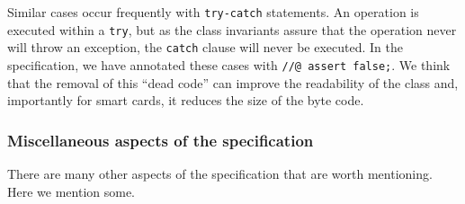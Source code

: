 \documentclass[a4paper]{llncs}
\begin{document}
Similar cases occur frequently with \texttt{try-catch} statements. An
operation is executed within a \texttt{try}, but as the class invariants
assure that the operation never will throw an exception, the
\texttt{catch} clause will never be executed. In the specification, we 
have annotated these cases with \texttt{//@ assert false;}. We think
that the removal of this ``dead code'' can improve the readability of
the class and, importantly for smart cards, it reduces the 
size of the byte code.


\subsubsection{Miscellaneous aspects of the specification}
There are many other aspects of the specification that are worth
mentioning. Here we mention some.
\end{document}
